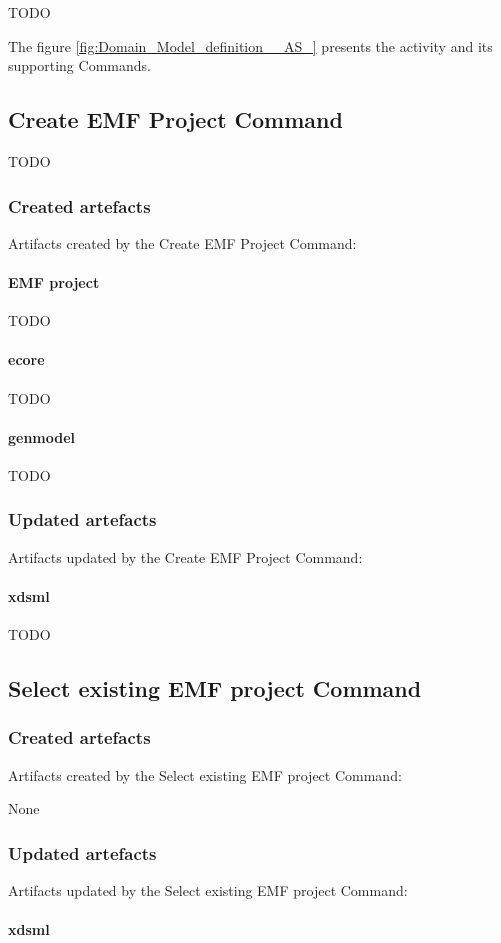 \documentclass{gemoc} %
\begin{document}
TODO

The figure \ref{fig:Domain_Model_definition__AS_} presents the activity and its supporting Commands.

\subsection{Create EMF Project Command}
TODO
\subsubsection{Created artefacts}
Artifacts created by the Create EMF Project Command:
\paragraph{EMF project} 
TODO\paragraph{ecore} 
TODO\paragraph{genmodel} 
TODO
\subsubsection{Updated artefacts}
Artifacts updated by the Create EMF Project Command:
\paragraph{xdsml} 
TODO

\subsection{Select existing EMF project Command}

\subsubsection{Created artefacts}
Artifacts created by the Select existing EMF project Command:

	None
\subsubsection{Updated artefacts}
Artifacts updated by the Select existing EMF project Command:
\paragraph{xdsml} 
\end{document}
